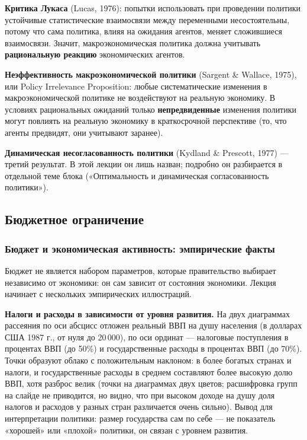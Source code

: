 \documentclass[11pt,a4paper]{article}
\begin{document}
\textbf{Критика Лукаса} (Lucas, 1976): попытки использовать при проведении политики устойчивые статистические взаимосвязи между переменными несостоятельны, потому что сама политика, влияя на ожидания агентов, меняет сложившиеся взаимосвязи. Значит, макроэкономическая политика должна учитывать \textbf{рациональную реакцию} экономических агентов.

\textbf{Неэффективность макроэкономической политики} (Sargent \& Wallace, 1975), или Policy Irrelevance Proposition: любые систематические изменения в макроэкономической политике не воздействуют на реальную экономику. В условиях рациональных ожиданий только \textbf{непредвиденные} изменения политики могут повлиять на реальную экономику в краткосрочной перспективе (то, что агенты предвидят, они учитывают заранее).

\textbf{Динамическая несогласованность политики} (Kydland \& Prescott, 1977) --- третий результат. В этой лекции он лишь назван; подробно он разбирается в отдельной теме блока («Оптимальность и динамическая согласованность политики»).

\subsection{Бюджетное ограничение}

\subsubsection{Бюджет и экономическая активность: эмпирические факты}

Бюджет не является набором параметров, которые правительство выбирает независимо от экономики: он сам зависит от состояния экономики. Лекция начинает с нескольких эмпирических иллюстраций.

\textbf{Налоги и расходы в зависимости от уровня развития.} На двух диаграммах рассеяния по оси абсцисс отложен реальный ВВП на душу населения (в долларах США 1987 г., от нуля до 20\,000), по оси ординат --- налоговые поступления в процентах ВВП (до 50\%) и государственные расходы в процентах ВВП (до 70\%). Точки образуют облако с положительным наклоном: в более богатых странах и налоги, и государственные расходы в среднем составляют более высокую долю ВВП, хотя разброс велик (точки на диаграммах двух цветов; расшифровка групп на слайде не приводится, но видно, что при высоком доходе на душу доля налогов и расходов у разных стран различается очень сильно). Вывод для интерпретации политики: размер государства сам по себе --- не показатель «хорошей» или «плохой» политики, он связан с уровнем развития.
\end{document}
